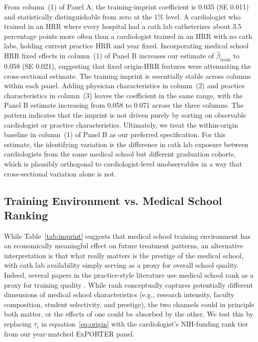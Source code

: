 \documentclass[12pt]{article}
\begin{document}
From column~(1) of Panel A, the training-imprint coefficient is 0.035 (SE 0.011) and statistically distinguishable from zero at the 1\% level. A cardiologist who trained in an HRR where every hospital had a cath lab catheterizes about 3.5 percentage points more often than a cardiologist trained in an HRR with no cath labs, holding current practice HRR and year fixed. Incorporating medical school HRR fixed effects in column~(1) of Panel B increases our estimate of $\hat\beta_{\text{train}}$ to 0.058 (SE 0.021), suggesting that fixed origin-HRR features were attenuating the cross-sectional estimate. The training imprint is essentially stable across columns within each panel. Adding physician characteristics in column~(2) and practice characteristics in column~(3) leaves the coefficient in the same range, with the Panel B estimate increasing from 0.058 to 0.071 across the three columns. The pattern indicates that the imprint is not driven purely by sorting on observable cardiologist or practice characteristics. Ultimately, we treat the within-origin baseline in column~(1) of Panel B as our preferred specification. For this estimate, the identifying variation is the difference in cath lab exposure between cardiologists from the same medical school but different graduation cohorts, which is plausibly orthogonal to cardiologist-level unobservables in a way that cross-sectional variation alone is not.

\subsection{Training Environment vs. Medical School Ranking}\label{sec:imprint-rank}

While Table~\ref{tab:imprint} suggests that medical school training environment has an economically meaningful effect on future treatment patterns, an alternative interpretation is that what really matters is the prestige of the medical school, with cath lab availability simply serving as a proxy for overall school quality. Indeed, several papers in the practice-style literature use medical school rank as a proxy for training quality \citep{schnell2018, doyle_jr_returns_2010}. While rank conceptually captures potentially different dimensions of medical school characteristics (e.g., research intensity, faculty composition, student selectivity, and prestige), the two channels could in principle both matter, or the effects of one could be absorbed by the other. We test this by replacing $\tau_i$ in equation~\eqref{eq:origin} with the cardiologist's NIH-funding rank tier from our year-matched ExPORTER panel.
\end{document}
